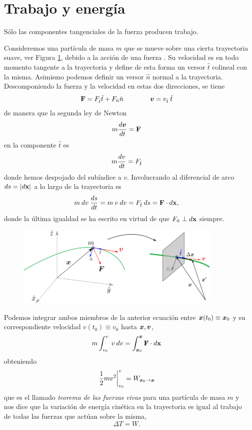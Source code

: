 \documentclass[10pt,oneside]{CBFT_book}
\begin{document}
\section{Trabajo y energía}


Sólo las componentes tangenciales de la fuerza producen trabajo.

Consideremos una partícula de masa $ m $ que se mueve sobre una cierta trayectoria suave, ver {Figura} 
\ref{fig_mc_workenergy}, debido a la acción de una fuerza .
Su velocidad  es en todo momento tangente a la trayectoria y define de esta forma un versor $ \hat{t} $
colineal con la misma. Asimismo podemos definir un versor $ \hat{n} $ normal a la trayectoria.
Descomponiendo la fuerza y la velocidad en estas dos direcciones, se tiene 
\[
	\vb{F} = F_{\hat{t}} \hat{t}  + F_{\hat{n}} \hat{n} \qquad \qquad \vB{v} = v_{\hat{t}} \: \hat{t}
\]
de manera que la segunda ley de Newton 
\[
	m \dtot{\vB{v}}{t} = \vb{F}
\]
en la componente $\hat{t}$ es
\[
	m \frac{d^{\hspace{-0.05em}} {v}}{d {t}^{\hspace{-0.05em}}} = F_{\hat{t}}
\]
donde hemos despojado del subíndice a $v$. Involucrando al diferencial de arco $ ds = | d\vb{x} | $ a lo largo de la 
trayectoria es
\[
	m \: dv \:\dtot{s}{t} = m \: v \: dv = F_{\hat{t}} \: ds = \vb{F} \cdot d\vb{x},
\]
donde la última igualdad se ha escrito en virtud de que $ F_{\hat{n}} \perp d\vb{x} $ siempre.

\begin{figure}[hbt]
	\begin{center}
	\includegraphics[width=0.9\textwidth]{images/fig_mc_workandenergy.pdf}	
	\end{center}
	\caption{}
	\label{fig_mc_workenergy}
\end{figure} 

Podemos integrar ambos miembros de la anterior ecuación entre $\vB{x}(t_0) \equiv \vB{x}_0$ y su 
correspondiente velocidad $v(t_0) \equiv v_0$ hasta $\vB{x}, \vB{v}$, 
\[
	m \int_{v_0}^v \: v \: dv = \int_{\vB{x}_0}^{\vB{x}}  \vb{F} \cdot d\vb{x}
\]
obteniendo
\[
	\left. \frac{1}{2} m v^2 \right|_{v_0}^v = W_{\vB{x}_0 \to \vB{x}} 
\]
que es el llamado \emph{teorema de las fuerzas vivas} para una partícula de masa $m$ y nos dice que la
variación de energía cinética en la trayectoria es igual al trabajo de todas las fuerzas que actúan
sobre la misma,
\[
	\Delta T = W.
\]
\end{document}
